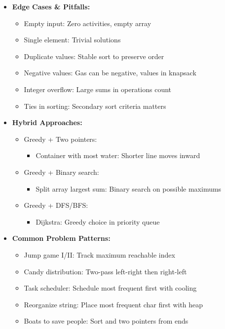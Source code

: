 \documentclass[a4paper,10pt]{book}
\begin{document}
\begin{itemize}
    \item \textbf{Edge Cases \& Pitfalls:}
    \begin{itemize}
        \item Empty input: Zero activities, empty array
        \item Single element: Trivial solutions
        \item Duplicate values: Stable sort to preserve order
        \item Negative values: Gas can be negative, values in knapsack
        \item Integer overflow: Large sums in operations count
        \item Ties in sorting: Secondary sort criteria matters
    \end{itemize}
    
    \item \textbf{Hybrid Approaches:}
    \begin{itemize}
        \item Greedy + Two pointers:
        \begin{itemize}
            \item Container with most water: Shorter line moves inward
        \end{itemize}
        \item Greedy + Binary search:
        \begin{itemize}
            \item Split array largest sum: Binary search on possible maximums
        \end{itemize}
        \item Greedy + DFS/BFS:
        \begin{itemize}
            \item Dijkstra: Greedy choice in priority queue
        \end{itemize}
    \end{itemize}
    
    \item \textbf{Common Problem Patterns:}
    \begin{itemize}
        \item Jump game I/II: Track maximum reachable index
        \item Candy distribution: Two-pass left-right then right-left
        \item Task scheduler: Schedule most frequent first with cooling
        \item Reorganize string: Place most frequent char first with heap
        \item Boats to save people: Sort and two pointers from ends
    \end{itemize}
    

\end{itemize}
\end{document}
